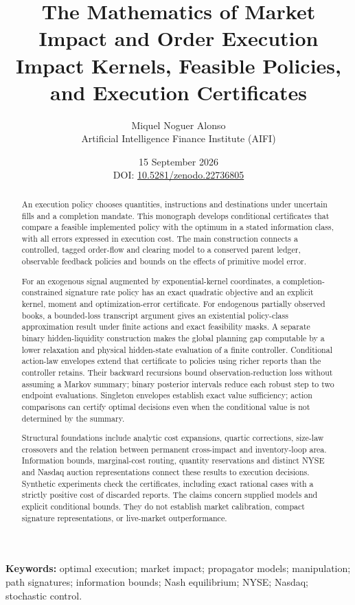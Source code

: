 \documentclass[11pt]{article}
\title{The Mathematics of Market Impact and Order Execution\\[2pt]
\large Impact Kernels, Feasible Policies, and Execution Certificates}
\author{Miquel Noguer Alonso\\ Artificial Intelligence Finance Institute (AIFI)}
\date{15 September 2026\\[5pt]\small DOI:
\href{https://doi.org/10.5281/zenodo.22736805}{10.5281/zenodo.22736805}}
\numberwithin{equation}{section}
\theoremstyle{definition}
\theoremstyle{remark}
\theoremstyle{definition}
\begin{document}
\maketitle
\begin{abstract}
An execution policy chooses quantities, instructions and destinations under
uncertain fills and a completion mandate. This monograph develops conditional
certificates that compare a feasible implemented policy with the optimum in
a stated information class, with all errors expressed in execution cost.
The main construction connects a controlled, tagged order-flow and clearing
model to a conserved parent ledger, observable feedback policies and bounds
on the effects of primitive model error.

For an exogenous signal augmented by exponential-kernel coordinates, a
completion-constrained signature rate policy has an exact quadratic objective
and an explicit kernel, moment and optimization-error certificate. For
endogenous partially observed books, a bounded-loss transcript argument gives
an existential policy-class approximation result under finite actions and
exact feasibility masks. A separate binary hidden-liquidity construction
makes the global planning gap computable by a lower relaxation and physical
hidden-state evaluation of a finite controller. Conditional action-law
envelopes extend that certificate to policies using richer reports than the
controller retains. Their backward recursions bound observation-reduction
loss without assuming a Markov summary; binary posterior intervals reduce
each robust step to two endpoint evaluations. Singleton envelopes establish
exact value sufficiency; action comparisons can certify optimal decisions
even when the conditional value is not determined by the summary.

Structural foundations include analytic cost expansions, quartic corrections,
size-law crossovers and the relation between permanent cross-impact and
inventory-loop area. Information bounds, marginal-cost routing, quantity
reservations and distinct NYSE and Nasdaq auction representations connect
these results to execution decisions. Synthetic experiments check the
certificates, including exact rational cases with a strictly positive cost
of discarded reports. The claims concern supplied models and explicit
conditional bounds. They do not establish market calibration, compact
signature representations, or live-market outperformance.
\end{abstract}

\noindent\textbf{Keywords:} optimal execution; market impact; propagator models; manipulation; path signatures; information bounds; Nash equilibrium; NYSE; Nasdaq; stochastic control.
\newpage
\tableofcontents
\newpage
\end{document}
